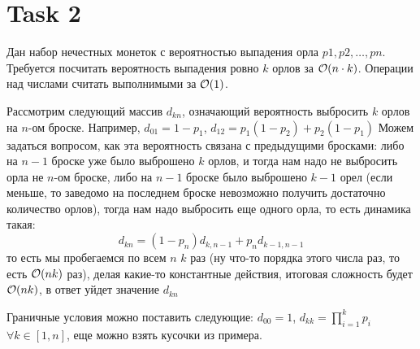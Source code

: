 \section{Task 2}
\begin{task}
    Дан набор нечестных монеток с вероятностью выпадения орла $p1, p2, \ldots, pn$. Требуется посчитать вероятность выпадения ровно $k$ орлов за $\mathcal{O}(n \cdot k)$. Операции над числами считать выполнимыми за $\mathcal{O}(1)$.
\end{task}

\begin{solution}
    Рассмотрим следующий массив $d_{kn}$, означающий вероятность выбросить $k$ орлов на $n$-ом броске.
    Например, $d_{01} = 1 - p_1$, $d_{12} = p_1(1-p_2) + p_2(1-p_1)$
    Можем задаться вопросом, как эта вероятность связана с предыдущими бросками: либо на $n-1$ броске уже было выброшено $k$ орлов, и тогда нам надо не выбросить орла не $n$-ом броске, либо на $n-1$ броске было выброшено $k-1$ орел (если меньше, то заведомо на последнем броске невозможно получить достаточно количество орлов), тогда нам надо выбросить еще одного орла, то есть динамика такая:
    \begin{equation}
        d_{kn} = (1 - p_n)d_{k,n-1} + p_nd_{k-1,n-1}
    \end{equation}
    то есть мы пробегаемся по всем $n$ $k$ раз (ну что-то порядка этого числа раз, то есть $\mathcal{O}(nk)$ раз), делая какие-то константные действия, итоговая сложность будет $\mathcal{O}(nk)$, в ответ уйдет значение $d_{kn}$
    
    \begin{upd}
        Граничные условия можно поставить следующие:
        $d_{00} = 1$, $d_{kk} = \prod\limits_{i=1}^kp_i$ $\forall k\in[1,n]$, еще можно взять кусочки из примера.
    \end{upd}
\end{solution}